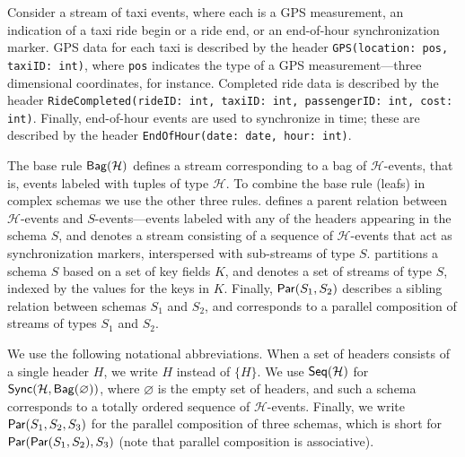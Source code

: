 \begin{example}
\label{45:ex:taxi-distance-schema-headers}
Consider a stream of taxi events, where each is a GPS measurement, an indication of a taxi ride begin or a ride end, or an end-of-hour synchronization marker.
GPS data for each taxi is described by the header \texttt{GPS(location: pos, taxiID: int)}, where \texttt{pos} indicates the type of a GPS measurement---three dimensional coordinates, for instance.
Completed ride data is described by the header \texttt{RideCompleted(rideID: int, taxiID: int, passengerID: int, cost: int)}.
Finally, end-of-hour events are used to synchronize in time; these are described by the header \texttt{EndOfHour(date: date, hour: int)}.
\end{example}

The base rule $\mathsf{Bag}({\mathcal{H}})$  defines a stream corresponding to a bag of $\mathcal{H}$-events, that is, events labeled with tuples of type $\mathcal{H}$. To combine the base rule (leafs) in complex schemas we use the other three rules.  defines a parent relation between $\mathcal{H}$-events
and $S$-events---events labeled with any of the headers appearing in the schema $S$, and denotes a stream consisting of a sequence of $\mathcal{H}$-events that act as synchronization markers, interspersed with sub-streams of type $S$.
 partitions a schema $S$ based on a set of key fields $K$,
and denotes a set of streams of type $S$, indexed by the values for the keys in $K$.
Finally, $\mathsf{Par}({S_1}, {S_2})$ describes a sibling relation between schemas $S_1$ and $S_2$,  and corresponds to a parallel composition
of streams of types $S_1$ and $S_2$.

We use the following notational abbreviations.
When a set of headers consists of a single header $H$, we write $H$ instead of $\{H\}$.
We use $\mathsf{Seq}({\mathcal{H}})$ for
$\mathsf{Sync}({\mathcal{H}}, \mathsf{Bag}({\varnothing}))$,
 where $\varnothing$ is the empty set of headers, and such a schema corresponds to a totally ordered sequence of $\mathcal{H}$-events.
Finally, we write $\mathsf{Par}({{S}_1}, {{S}_2}, {{S}_3})$
for the parallel composition of three schemas, which is short for
$\mathsf{Par}({\mathsf{Par}({{S}_1}, {{S}_2})}, {{S}_3})$ (note that parallel composition is associative).

